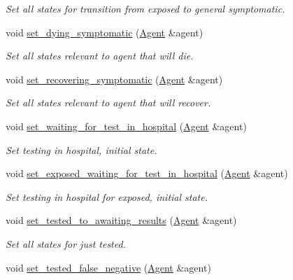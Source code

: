 \begin{DoxyCompactItemize}
\begin{DoxyCompactList}\small\item\em Set all states for transition from exposed to general symptomatic. \end{DoxyCompactList}\item 
void \hyperlink{classHspEmployeeStatesManager_a8496e09c1ad539dcfc4b9fc64ba86fbf}{set\+\_\+dying\+\_\+symptomatic} (\hyperlink{classAgent}{Agent} \&agent)
\begin{DoxyCompactList}\small\item\em Set all states relevant to agent that will die. \end{DoxyCompactList}\item 
void \hyperlink{classHspEmployeeStatesManager_a3ed9fedc4e2b32d21d472463af5d3df5}{set\+\_\+recovering\+\_\+symptomatic} (\hyperlink{classAgent}{Agent} \&agent)
\begin{DoxyCompactList}\small\item\em Set all states relevant to agent that will recover. \end{DoxyCompactList}\item 
void \hyperlink{classHspEmployeeStatesManager_a76dfcc6cd9c617f881bc44984a673174}{set\+\_\+waiting\+\_\+for\+\_\+test\+\_\+in\+\_\+hospital} (\hyperlink{classAgent}{Agent} \&agent)
\begin{DoxyCompactList}\small\item\em Set testing in hospital, initial state. \end{DoxyCompactList}\item 
void \hyperlink{classHspEmployeeStatesManager_aca27d50807561a44dd4a96eba69dc2bf}{set\+\_\+exposed\+\_\+waiting\+\_\+for\+\_\+test\+\_\+in\+\_\+hospital} (\hyperlink{classAgent}{Agent} \&agent)
\begin{DoxyCompactList}\small\item\em Set testing in hospital for exposed, initial state. \end{DoxyCompactList}\item 
void \hyperlink{classHspEmployeeStatesManager_a4b0f847d5e9ce5e1b48813ba506cfe36}{set\+\_\+tested\+\_\+to\+\_\+awaiting\+\_\+results} (\hyperlink{classAgent}{Agent} \&agent)
\begin{DoxyCompactList}\small\item\em Set all states for just tested. \end{DoxyCompactList}\item 
void \hyperlink{classHspEmployeeStatesManager_aaefccb28d50be6a89b20255779275520}{set\+\_\+tested\+\_\+false\+\_\+negative} (\hyperlink{classAgent}{Agent} \&agent)

\end{DoxyCompactItemize}
